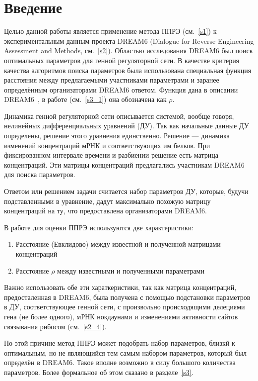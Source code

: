 \chapter*{Введение}							%

Целью данной работы является применение метода ППРЭ (см.~\ref{s1}) к 
экспериментальным данным проекта DREAM6 (Dialogue for Reverse Engineering 
Assessment and Methods, см.~\ref{s2}). Областью исследования DREAM6 был поиск 
оптимальных параметров для генной регуляторной сети. В качестве критерия 
качества алгоритмов поиска параметров была использована специальная функция 
расстояния между предлагаемыми участниками параметрами и заранее определённым 
организаторами DREAM6 ответом. Функция дана в описании DREAM6~\cite{bibDREAM}, 
в работе (см.~\ref{s3_1}) она обозначена как $\rho$.

Динамика генной регуляторной сети описывается системой, вообще говоря, 
нелинейных дифференциальных уравнений (ДУ). Так как начальные данные ДУ 
определены, решение этого уравнения единственно. Решение — динамика изменений 
концентраций мРНК и соответствующих им белков. При фиксированном интервале 
времени и разбиении решение есть матрица концентраций. Эти матрицы концентраций 
предлагались участникам DREAM6 для поиска параметров. 

Ответом или решением задачи считается набор параметров ДУ, которые, будучи 
подставленными в уравнение, дадут максимально похожую матрицу концентраций на 
ту, что предоставлена организаторами DREAM6.

В работе для оценки ППРЭ используются две характеристики:
\begin{enumerate}
  \item Расстояние (Евклидово) между известной и полученной матрицами 
  концентраций
  \item Расстояние $\rho$ между известными и полученными параметрами
\end{enumerate}

Важно использовать обе эти хараткеристики, так как матрица концентраций, 
предосталенная в DREAM6, была получена с помощью подстановки параметров 
в ДУ, соответствующее генной сети, с произвольно происходящими делециями гена
(не более одного), мРНК нокдаунами и изменениями активности сайтов связывания 
рибосом (см.~\ref{s2_4}). 

По этой причине метод ППРЭ может подобрать набор параметров, близкй к 
оптимальным, но не являющийся тем самым набором параметров, который был 
определён в DREAM6. Такое вполне возможно в силу большого количества параметров.
Более формальное об этом сказано в разделе~\ref{s3}.

\clearpage
